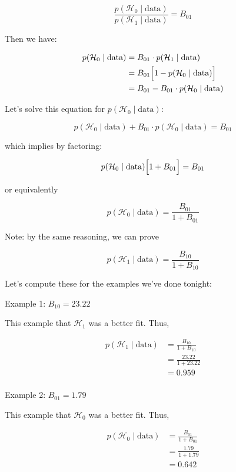 \documentclass[portrait,footrule,17pt]{foils}
\begin{document}
\[
\frac{p(\mathcal{H}_0\mid \text{data})}{p(\mathcal{H}_1\mid \text{data})} = B_{01}
\]

Then we have:

\begin{align*}
p(\mathcal{H}_0\mid \text{data}) &= B_{01}\cdot p(\mathcal{H}_1\mid \text{data})\\
&= B_{01}\Bigl[1-p(\mathcal{H}_0\mid \text{data})\Bigr]\\
&= B_{01} - B_{01}\cdot p(\mathcal{H}_0\mid \text{data})\\
\end{align*}

Let's solve this equation for \(p(\mathcal{H}_0\mid \text{data})\):

\[
p(\mathcal{H}_0\mid \text{data}) + B_{01}\cdot p(\mathcal{H}_0\mid \text{data}) = B_{01}
\]

which implies by factoring:

\[
p(\mathcal{H}_0\mid \text{data})\Bigl[1+B_{01}\Bigr] = B_{01}
\]

or equivalently

\[
p(\mathcal{H}_0\mid \text{data}) = \frac{B_{01}}{1+B_{01}}
\]


Note: by the same reasoning, we can prove

\[
p(\mathcal{H}_1\mid \text{data}) = \frac{B_{10}}{1+B_{10}}
\]

\foilhead[-1cm]{}
\label{sec:org0cbf361}
Let's compute these for the examples we've done tonight:

Example 1: \(B_{10}=23.22\)

This example that \(\mathcal{H}_1\) was a better fit.  Thus,

\begin{align*}
p(\mathcal{H}_1\mid \text{data}) &= \frac{B_{10}}{1+B_{10}}\\
&= \frac{23.22}{1+23.22}\\
&= 0.959\\
\end{align*}

Example 2: \(B_{01}=1.79\)

This example that \(\mathcal{H}_0\) was a better fit.  Thus,

\begin{align*}
p(\mathcal{H}_0\mid \text{data}) &= \frac{B_{01}}{1+B_{01}}\\
&= \frac{1.79}{1+1.79}\\
&= 0.642
\end{align*}
\end{document}

